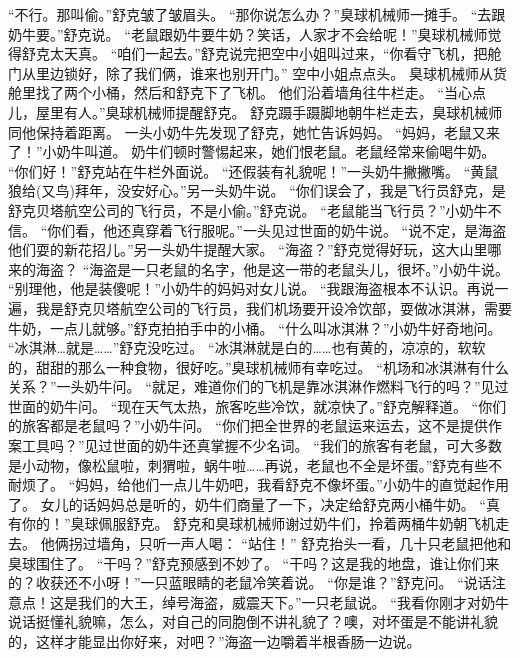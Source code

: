 \documentclass[a4paper,12pt,UTF8,twoside]{ctexbook}
\begin{document}
        “不行。那叫偷。”舒克皱了皱眉头。 
        “那你说怎么办？”臭球机械师一摊手。 
        “去跟奶牛要。”舒克说。 
        “老鼠跟奶牛要牛奶？笑话，人家才不会给呢！”臭球机械师觉得舒克太天真。 
        “咱们一起去。”舒克说完把空中小姐叫过来，“你看守飞机，把舱门从里边锁好，除了我们俩，谁来也别开门。” 
        空中小姐点点头。 
        臭球机械师从货舱里找了两个小桶，然后和舒克下了飞机。 
        他们沿着墙角往牛栏走。 
        “当心点儿，屋里有人。”臭球机械师提醒舒克。 
        舒克蹑手蹑脚地朝牛栏走去，臭球机械师同他保持着距离。 
        一头小奶牛先发现了舒克，她忙告诉妈妈。 
        “妈妈，老鼠又来了！”小奶牛叫道。 
        奶牛们顿时警惕起来，她们恨老鼠。老鼠经常来偷喝牛奶。 
        “你们好！”舒克站在牛栏外面说。 
        “还假装有礼貌呢！”一头奶牛撇撇嘴。 
        “黄鼠狼给(又鸟)拜年，没安好心。”另一头奶牛说。 
        “你们误会了，我是飞行员舒克，是舒克贝塔航空公司的飞行员，不是小偷。”舒克说。 
        “老鼠能当飞行员？”小奶牛不信。 
        “你们看，他还真穿着飞行服呢。”一头见过世面的奶牛说。 
        “说不定，是海盗他们耍的新花招儿。”另一头奶牛提醒大家。 
        “海盗？”舒克觉得好玩，这大山里哪来的海盗？ 
        “海盗是一只老鼠的名字，他是这一带的老鼠头儿，很坏。”小奶牛说。 
        “别理他，他是装傻呢！”小奶牛的妈妈对女儿说。 
        “我跟海盗根本不认识。再说一遍，我是舒克贝塔航空公司的飞行员，我们机场要开设冷饮部，耍做冰淇淋，需要牛奶，一点儿就够。”舒克拍拍手中的小桶。 
        “什么叫冰淇淋？”小奶牛好奇地问。 
        “冰淇淋…就是……”舒克没吃过。 
        “冰淇淋就是白的……也有黄的，凉凉的，软软的，甜甜的那么一种食物，很好吃。”臭球机械师有幸吃过。 
        “机场和冰淇淋有什么关系？”一头奶牛问。 
        “就足，难道你们的飞机是靠冰淇淋作燃料飞行的吗？”见过世面的奶牛问。 
        “现在天气太热，旅客吃些冷饮，就凉快了。”舒克解释道。 
        “你们的旅客都是老鼠吗？”小奶牛问。 
        “你们把全世界的老鼠运来运去，这不是提供作案工具吗？”见过世面的奶牛还真掌握不少名词。 
        “我们的旅客有老鼠，可大多数是小动物，像松鼠啦，刺猬啦，蜗牛啦……再说，老鼠也不全是坏蛋。”舒克有些不耐烦了。 
        “妈妈，给他们一点儿牛奶吧，我看舒克不像坏蛋。”小奶牛的直觉起作用了。 
        女儿的话妈妈总是听的，奶牛们商量了一下，决定给舒克两小桶牛奶。 
        “真有你的！”臭球佩服舒克。 
        舒克和臭球机械师谢过奶牛们，拎着两桶牛奶朝飞机走去。 
        他俩拐过墙角，只听一声人喝：  “站住！” 
        舒克抬头一看，几十只老鼠把他和臭球围住了。 
        “干吗？”舒克预感到不妙了。 
        “干吗？这是我的地盘，谁让你们来的？收获还不小呀！”一只蓝眼睛的老鼠冷笑着说。 
        “你是谁？”舒克问。 
        “说话注意点！这是我们的大王，绰号海盗，威震天下。”一只老鼠说。 
        “我看你刚才对奶牛说话挺懂礼貌嘛，怎么，对自己的同胞倒不讲礼貌了？噢，对坏蛋是不能讲礼貌的，这样才能显出你好来，对吧？”海盗一边嚼着半根香肠一边说。 
\end{document}
